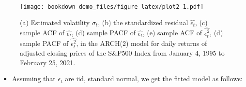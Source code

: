 \documentclass[]{book}
\newenvironment{Shaded}{\begin{snugshade}}{\end{snugshade}}
\newcommand{\DataTypeTok}[1]{\textcolor[rgb]{0.13,0.29,0.53}{#1}}
\newcommand{\DecValTok}[1]{\textcolor[rgb]{0.00,0.00,0.81}{#1}}
\newcommand{\KeywordTok}[1]{\textcolor[rgb]{0.13,0.29,0.53}{\textbf{#1}}}
\newcommand{\NormalTok}[1]{#1}
\newcommand{\OperatorTok}[1]{\textcolor[rgb]{0.81,0.36,0.00}{\textbf{#1}}}
\newcommand{\OtherTok}[1]{\textcolor[rgb]{0.56,0.35,0.01}{#1}}
\newcommand{\StringTok}[1]{\textcolor[rgb]{0.31,0.60,0.02}{#1}}
\providecommand{\tightlist}{%
  \setlength{\itemsep}{0pt}\setlength{\parskip}{0pt}}
\begin{document}
\begin{Shaded}
\end{Shaded}

\begin{figure}
\centering
\texttt{[image: bookdown-demo\_files/figure-latex/plot2-1.pdf]}
\caption{\label{fig:plot2}(a) Estimated volatility \(\hat{\sigma_t}\), (b) the standardized residual \(\hat{\epsilon_t}\), (c) sample ACF of \(\hat{\epsilon_t}\), (d) sample PACF of \(\hat{\epsilon_t}\), (e) sample ACF of \(\hat{\epsilon_t^2}\), (d) sample PACF of \(\hat{\epsilon_t^2}\), in the ARCH(2) model for daily returns of adjusted closing prices of the S\&P500 Index from January 4, 1995 to February 25, 2021.}
\end{figure}

\newpage

\begin{itemize}
\tightlist
\item
  Assuming that \(\epsilon_t\) are iid, standard normal, we get the fitted model as follows:
\end{itemize}
\end{document}

